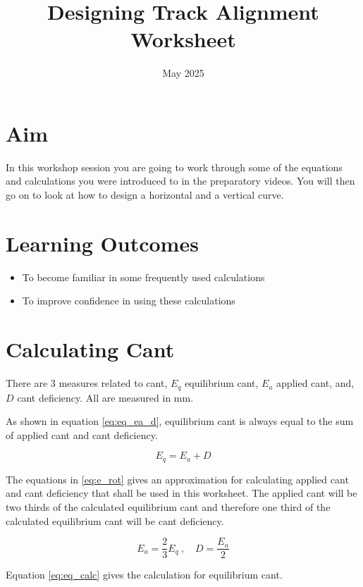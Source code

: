 \documentclass{bcrre_exam}
\title{Designing Track Alignment Worksheet}
\author{}
\date{May 2025}
\begin{document}
\maketitle

\section*{Aim}
In this workshop session you are going to work through some of the equations and calculations you were introduced to in the preparatory videos. You will then go on to look at how to design a horizontal and a vertical curve.

\section*{Learning Outcomes}

\begin{itemize}
    \item To become familiar in some frequently used calculations
    \item To improve confidence in using these calculations
\end{itemize}

\newpage
\section{Calculating Cant}

There are 3 measures related to cant, $E_q$ equilibrium cant, $E_a$ applied cant, and, $D$ cant deficiency. All are measured in \unit{mm}.

As shown in equation \ref{eq:eq_ea_d}, equilibrium cant is always equal to the sum of applied cant and cant deficiency.

\begin{equation}
    \label{eq:eq_ea_d}
    E_q = E_a+D
\end{equation}

The equations in \ref{eq:e_rot} gives an approximation for calculating applied cant and cant deficiency that shall be used in this worksheet. The applied cant will be two thirds of the calculated equilibrium cant and therefore one third of the calculated equilibrium cant will be cant deficiency.

\begin{equation}
    \label{eq:e_rot}
        E_a = \frac{2}{3}E_q\ , \quad
        D = \frac{E_a}{2}
\end{equation}

Equation \ref{eq:eq_calc} gives the calculation for equilibrium cant.
\end{document}
